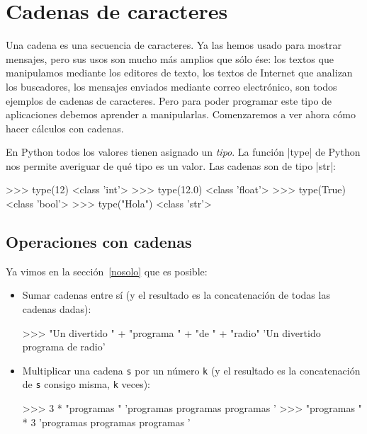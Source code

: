 \chapter{Cadenas de caracteres}

Una cadena es una secuencia de caracteres. Ya las hemos usado para mostrar
mensajes, pero sus usos son mucho más amplios que sólo ése: los textos que
manipulamos mediante los editores de texto, los textos de Internet que
analizan los buscadores, los mensajes enviados mediante correo electrónico,
son todos ejemplos de cadenas de caracteres. Pero para poder programar este
tipo de aplicaciones debemos aprender a manipularlas. Comenzaremos a ver
ahora cómo hacer cálculos con cadenas.

\begin{sabias_que}
En Python todos los valores tienen asignado un \emph{tipo}. 	La función |type|
de Python nos permite averiguar de qué tipo es un valor. Las cadenas son de
tipo |str|:

\begin{codigo-python-sn}
>>> type(12)
<class 'int'>
>>> type(12.0)
<class 'float'>
>>> type(True)
<class 'bool'>
>>> type("Hola")
<class 'str'>
\end{codigo-python-sn}
\end{sabias_que}

\section{Operaciones con cadenas}

Ya vimos en la sección~\ref{nosolo} que es posible:

\begin{itemize}
\item Sumar cadenas entre sí (y el resultado es la concatenación
de todas las cadenas dadas):

\begin{codigo-python-sn}
>>> "Un divertido " + "programa " + "de " + "radio"
'Un divertido programa de radio'
\end{codigo-python-sn}

\item Multiplicar una cadena \lstinline+s+ por un número \lstinline+k+ (y
el resultado es la concatenación de \lstinline+s+ consigo misma,
\lstinline+k+ veces):

\begin{codigo-python-sn}
>>> 3 * "programas "
'programas programas programas '
>>> "programas " * 3
'programas programas programas '
\end{codigo-python-sn}
\end{itemize}

